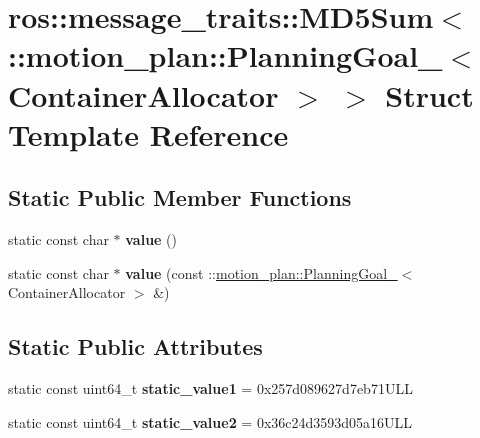 \hypertarget{structros_1_1message__traits_1_1MD5Sum_3_01_1_1motion__plan_1_1PlanningGoal___3_01ContainerAllocator_01_4_01_4}{}\section{ros\+:\+:message\+\_\+traits\+:\+:M\+D5\+Sum$<$ \+:\+:motion\+\_\+plan\+:\+:Planning\+Goal\+\_\+$<$ Container\+Allocator $>$ $>$ Struct Template Reference}
\label{structros_1_1message__traits_1_1MD5Sum_3_01_1_1motion__plan_1_1PlanningGoal___3_01ContainerAllocator_01_4_01_4}
\subsection*{Static Public Member Functions}
\begin{DoxyCompactItemize}
\item 
\mbox{\label{structros_1_1message__traits_1_1MD5Sum_3_01_1_1motion__plan_1_1PlanningGoal___3_01ContainerAllocator_01_4_01_4_af3b8074eb00ac8c0ad72ffd66f314970}} 
static const char $\ast$ {\bfseries value} ()
\item 
\mbox{\label{structros_1_1message__traits_1_1MD5Sum_3_01_1_1motion__plan_1_1PlanningGoal___3_01ContainerAllocator_01_4_01_4_a56525adec8019413f97aff3c5136179e}} 
static const char $\ast$ {\bfseries value} (const \+::\hyperlink{structmotion__plan_1_1PlanningGoal__}{motion\+\_\+plan\+::\+Planning\+Goal\+\_\+}$<$ Container\+Allocator $>$ \&)
\end{DoxyCompactItemize}
\subsection*{Static Public Attributes}
\begin{DoxyCompactItemize}
\item 
\mbox{\label{structros_1_1message__traits_1_1MD5Sum_3_01_1_1motion__plan_1_1PlanningGoal___3_01ContainerAllocator_01_4_01_4_a5314433979d349929d1b1318be813920}} 
static const uint64\+\_\+t {\bfseries static\+\_\+value1} = 0x257d089627d7eb71\+U\+LL
\item 
\mbox{\label{structros_1_1message__traits_1_1MD5Sum_3_01_1_1motion__plan_1_1PlanningGoal___3_01ContainerAllocator_01_4_01_4_a77240183c78fa80863f214da7b40a5aa}} 
static const uint64\+\_\+t {\bfseries static\+\_\+value2} = 0x36c24d3593d05a16\+U\+LL
\end{DoxyCompactItemize}


